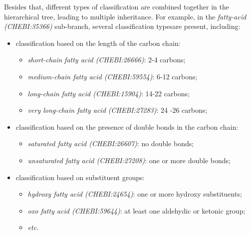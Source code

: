 \documentclass[9pt]{article}
\begin{document}
Besides that, different types of classification are combined together in the hierarchical tree, leading to multiple inheritance. For example, in the \textit{fatty-acid (CHEBI:35366)} sub-branch, several classification typesare present, including:
\begin{itemize}
\item classification based on the length of the carbon chain:
\begin{itemize}
\item \textit{short-chain fatty acid (CHEBI:26666)}: 2-4 carbons;
\item \textit{medium-chain fatty acid (CHEBI:59554)}: 6-12 carbons;
\item \textit{long-chain fatty acid (CHEBI:15904)}: 14-22 carbons;
\item \textit{very long-chain fatty acid (CHEBI:27283)}: 24 -26 carbons;
\end{itemize}
\item classification based on the presence of double bonds in the carbon chain:
\begin{itemize}
\item \textit{saturated fatty acid (CHEBI:26607)}: no double bonds;
\item \textit{unsaturated fatty acid (CHEBI:27208)}: one or more double bonds;
\end{itemize}
\item classification based on substituent groups:
\begin{itemize}
\item \textit{hydroxy fatty acid (CHEBI:24654)}: one or more hydroxy substituents;
\item \textit{oxo fatty acid (CHEBI:59644)}: at least one aldehydic or ketonic group;
\item \textit{etc.}
\end{itemize}
\end{itemize}
\end{document}
